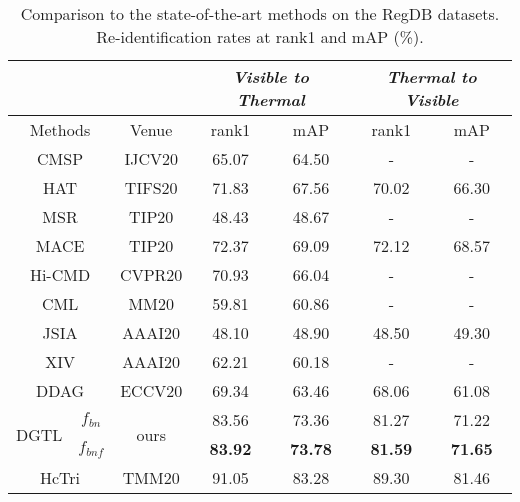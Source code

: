 \documentclass[journal]{IEEEtran}
\begin{document}
\begin{table}
\caption{Comparison to the state-of-the-art methods on the RegDB datasets. Re-identification rates at rank1 and mAP (\%).}
\label{tab:sota_regdb}
  \centering
  \begin{tabular}{lc|c|c|c||c|c}
    \toprule[2pt]
    \multicolumn{3}{c|}{}  & \multicolumn{2}{c||}{\emph{Visible to Thermal}} & \multicolumn{2}{c}{\emph{Thermal to Visible}} \\ \hline
      \multicolumn{2}{c|}{Methods} & Venue &   rank1   & mAP   &  rank1  & mAP      \\ \toprule[1pt]
      \multicolumn{2}{c|}{CMSP \cite{wu2020rgb}} & IJCV20 & 65.07   & 64.50  & -   & -  \\
      \multicolumn{2}{c|}{HAT \cite{ye2020vipr}} & TIFS20 & 71.83  & 67.56 & 70.02  & 66.30  \\
      \multicolumn{2}{c|}{MSR \cite{Feng2020LearningMR}} & TIP20 & 48.43  & 48.67  & -  & -  \\
      \multicolumn{2}{c|}{MACE \cite{Ye2020CrossModalityPR}} & TIP20 & 72.37 & 69.09 & 72.12 & 68.57 \\
      \multicolumn{2}{c|}{Hi-CMD \cite{choi2020hi}} & CVPR20 & 70.93  & 66.04   &  - & -   \\
      \multicolumn{2}{c|}{CML \cite{Ling2020ClassAwareMM}} & MM20 & 59.81 & 60.86  &  - & -   \\
      \multicolumn{2}{c|}{JSIA \cite{Wang2020CrossModalityPG}} & AAAI20 & 48.10  & 48.90 & 48.50  & 49.30 \\
      \multicolumn{2}{c|}{XIV \cite{Li2020InfraredVisibleCP}} & AAAI20 & 62.21  & 60.18  &  - & -   \\
\multicolumn{2}{c|}{DDAG \cite{ye2020dynamic}} & ECCV20 & 69.34  & 63.46 & 68.06  & 61.08 \\  \hline
      \multirow{2}{*}{DGTL} & $f_{bn}$& \multirow{2}{*}{ours} & 83.56 & 73.36 & 81.27 & 71.22 \\
                            & $f_{bnf}$& & \textbf{83.92} & \textbf{73.78} & \textbf{81.59} & \textbf{71.65} \\ \hline \hline
      \multicolumn{2}{c|}{HcTri \cite{Liu2020ParametersSE}} & TMM20 & 91.05 & 83.28 & 89.30 & 81.46 \\
      \toprule[2pt]
  \end{tabular}
\end{table}
\end{document}

